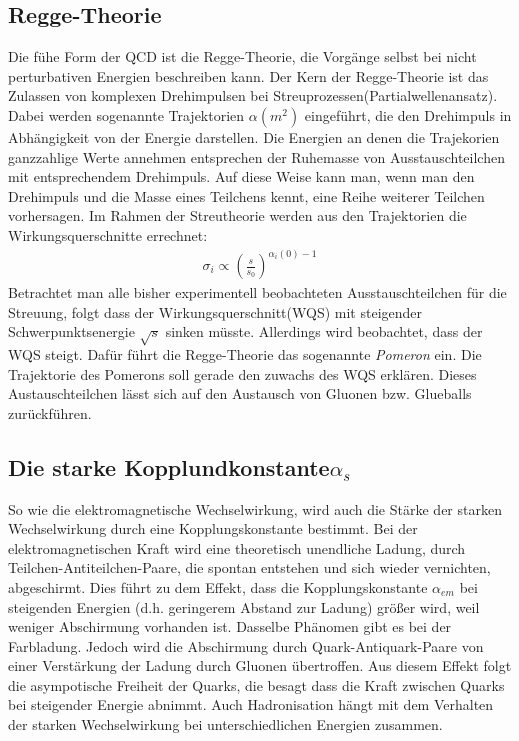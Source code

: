 \subsection{Regge-Theorie}
Die fühe Form der QCD ist die Regge-Theorie, die Vorgänge selbst bei nicht perturbativen Energien beschreiben kann. Der Kern der Regge-Theorie ist das Zulassen von komplexen Drehimpulsen bei Streuprozessen(Partialwellenansatz). Dabei werden sogenannte Trajektorien $\alpha(m^2)$ eingeführt, die den Drehimpuls in Abhängigkeit von der Energie darstellen. Die Energien an denen die Trajekorien ganzzahlige Werte annehmen entsprechen der Ruhemasse von Ausstauschteilchen mit entsprechendem Drehimpuls. Auf diese Weise kann man, wenn man den Drehimpuls und die Masse eines Teilchens kennt, eine Reihe weiterer Teilchen vorhersagen. Im Rahmen der Streutheorie werden aus den Trajektorien die Wirkungsquerschnitte errechnet: 
\begin{align*}
\sigma_{i} \propto \left(\frac{s}{s_0}\right)^{\alpha_i(0)-1}
\end{align*}
Betrachtet man alle bisher experimentell beobachteten Ausstauschteilchen für die Streuung, folgt dass der Wirkungsquerschnitt(WQS) mit steigender Schwerpunktsenergie $\sqrt{s}$ sinken müsste. Allerdings wird beobachtet, dass der WQS steigt. Dafür führt die Regge-Theorie das sogenannte \emph{Pomeron} ein. Die Trajektorie des Pomerons soll gerade den zuwachs des WQS erklären. Dieses Austauschteilchen lässt sich auf den Austausch von Gluonen bzw. Glueballs zurückführen. 
\subsection{Die starke Kopplundkonstante$\alpha_s$}
So wie die elektromagnetische Wechselwirkung, wird auch die Stärke der starken Wechselwirkung durch eine Kopplungskonstante bestimmt. Bei der elektromagnetischen Kraft wird eine theoretisch unendliche Ladung, durch Teilchen-Antiteilchen-Paare, die spontan entstehen und sich wieder vernichten, abgeschirmt. Dies führt zu dem Effekt, dass die Kopplungskonstante $\alpha_{em}$ bei steigenden Energien (d.h. geringerem Abstand zur Ladung) größer wird, weil weniger Abschirmung vorhanden ist. Dasselbe Phänomen gibt es bei der Farbladung. Jedoch wird die Abschirmung durch Quark-Antiquark-Paare von einer Verstärkung der Ladung durch Gluonen übertroffen. Aus diesem Effekt folgt die asympotische Freiheit der Quarks, die besagt dass die Kraft zwischen Quarks bei steigender Energie abnimmt. Auch Hadronisation hängt mit dem Verhalten der starken Wechselwirkung bei unterschiedlichen Energien zusammen.

